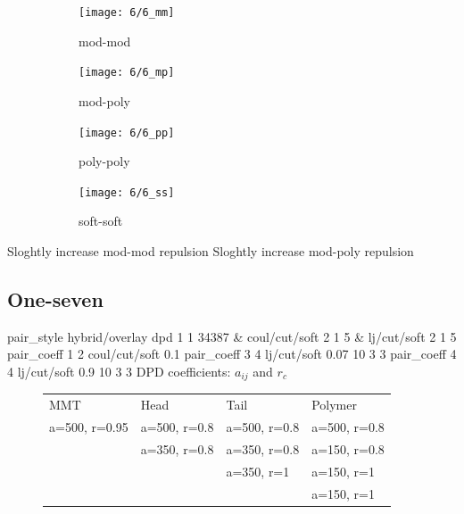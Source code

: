\documentclass[a4paper]{article}
\begin{document}
\begin{figure}[H]
\begin{subfigure}{0.24\textwidth}
  \centering
  \texttt{[image: 6/6\_mm]}
  \caption{mod-mod}
\end{subfigure}
\begin{subfigure}{0.24\textwidth}
  \centering
  \texttt{[image: 6/6\_mp]}
  \caption{mod-poly}
\end{subfigure}
\begin{subfigure}{0.24\textwidth}
  \centering
  \texttt{[image: 6/6\_pp]}
  \caption{poly-poly}
\end{subfigure}
\begin{subfigure}{0.24\textwidth}
  \centering
  \texttt{[image: 6/6\_ss]}
  \caption{soft-soft}
\end{subfigure}
\caption{}
\label{fig_1}
\end{figure}
Sloghtly increase mod-mod repulsion\newline
Sloghtly increase mod-poly repulsion\newline


\subsection*{One-seven}
pair\_style hybrid/overlay dpd 1 1 34387 \& coul/cut/soft 2 1 5 \& 
lj/cut/soft 2 1 5\newline
pair\_coeff 1 2 coul/cut/soft 0.1\newline
pair\_coeff 3 4 lj/cut/soft 0.07    10 3 3\newline
pair\_coeff 4 4 lj/cut/soft 0.9     10 3 3\newline
DPD coefficients: $a_{ij}$ and $r_c$
\begin{figure}[H]\begin{tabular}{llll}
MMT           & Head         & Tail         & Polymer      \\
a=500, r=0.95 & a=500, r=0.8 & a=500, r=0.8 & a=500, r=0.8 \\
              & a=350, r=0.8 & a=350, r=0.8 & a=150, r=0.8 \\
              &              & a=350, r=1   & a=150, r=1   \\
              &              &              & a=150, r=1   \\
\end{tabular}\end{figure}
\end{document}
